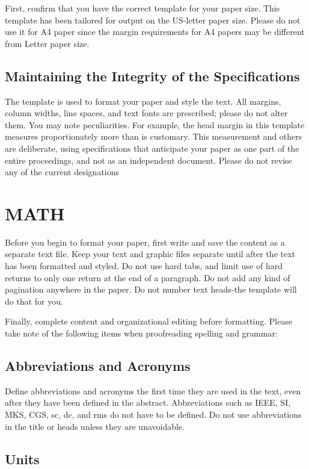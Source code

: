 \documentclass[letterpaper, 10 pt, conference]{ieeeconf}  %
\begin{document}
First, confirm that you have the correct template for your paper size. This template has been tailored for output on the US-letter paper size. Please do not use it for A4 paper since the margin requirements for A4 papers may be different from Letter paper size.

\subsection{Maintaining the Integrity of the Specifications}

The template is used to format your paper and style the text. All margins, column widths, line spaces, and text fonts are prescribed; please do not alter them. You may note peculiarities. For example, the head margin in this template measures proportionately more than is customary. This measurement and others are deliberate, using specifications that anticipate your paper as one part of the entire proceedings, and not as an independent document. Please do not revise any of the current designations

\section{MATH}

Before you begin to format your paper, first write and save the content as a separate text file. Keep your text and graphic files separate until after the text has been formatted and styled. Do not use hard tabs, and limit use of hard returns to only one return at the end of a paragraph. Do not add any kind of pagination anywhere in the paper. Do not number text heads-the template will do that for you.

Finally, complete content and organizational editing before formatting. Please take note of the following items when proofreading spelling and grammar:

\subsection{Abbreviations and Acronyms} Define abbreviations and acronyms the first time they are used in the text, even after they have been defined in the abstract. Abbreviations such as IEEE, SI, MKS, CGS, sc, dc, and rms do not have to be defined. Do not use abbreviations in the title or heads unless they are unavoidable.

\subsection{Units}
\end{document}
